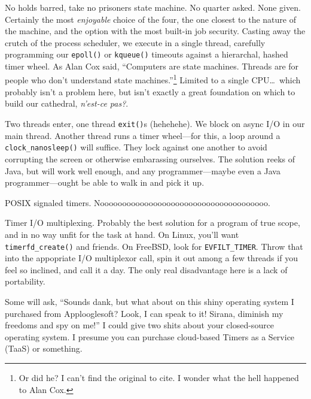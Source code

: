\begin{denseitemize}
\item{No holds barred, take no prisoners state machine. No quarter asked.
    None given. Certainly the most \textit{enjoyable} choice of the four, the
    one closest to the nature of the machine, and the option with the most
    built-in job security. Casting away the crutch of the process scheduler, we
    execute in a single thread, carefully programming our
    \texttt{epoll()}\cite{epoll7} or \texttt{kqueue()}\cite{kqueue2} timeouts
    against a hierarchal, hashed timer wheel\cite{timerwheels}. As Alan Cox
    said, ``Computers are state machines. Threads are for people who don't
    understand state machines.''\footnote{Or did he? I can't find the original
    to cite. I wonder what the hell happened to Alan Cox.} Limited to a single
  CPU\ldots\ which probably isn't a problem here, but isn't exactly a great foundation
  on which to build our cathedral, \textfrench{\textit{n'est-ce pas?}}.}
\item{Two threads enter, one thread \texttt{exit()}s (hehehehe). We block on
    async I/O in our main thread. Another thread runs a timer wheel---for this,
    a loop around a \texttt{clock\_nanosleep()} will suffice. They
    lock against one another to avoid corrupting the screen or otherwise
    embarassing ourselves. The solution reeks of Java, but will work well
    enough, and any programmer---maybe even a Java programmer---ought be able
    to walk in and pick it up.}
\item{POSIX signaled timers. Noooooooooooooooooooooooooooooooooooooo.}
\item{Timer I/O multiplexing. Probably the best solution for a program of true
    scope, and in no way unfit for the task at hand. On Linux, you'll want
    \texttt{timerfd\_create()} and friends. On FreeBSD, look for \texttt{EVFILT\_TIMER}.
    Throw that into the appopriate I/O multiplexor call, spin it out among a
    few threads if you feel so inclined\cite{libtorque}, and call it a day.
  The only real disadvantage here is a lack of portability.}
\end{denseitemize}

Some will ask, ``Sounds dank, but what about on this shiny operating system I
purchased from Applooglesoft? Look, I can speak to it! Sirana, diminish my
freedoms and spy on me!'' I could give two shits about your closed-source
operating system. I presume you can purchase cloud-based Timers as a Service
(TaaS) or something.

